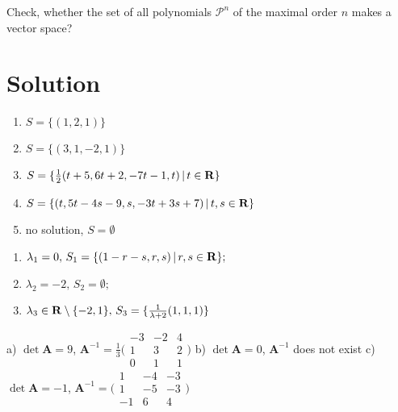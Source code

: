 \documentclass[a4paper,10pt]{book}
\def\Real{{\rm\bf R}}
\def\where{\,|\,}                    %
\begin{document}
\exercise \label{ex:vek8} 
Check, whether the set of all polynomials $\mathcal{P}^{n}$ of the maximal order
$n$ makes a vector space?



\section{Solution}

\begin{enumerate}[leftmargin=.75cm,align=left,label={\alph*)},itemsep=-5pt, topsep=-7pt]
    \item $S=\{(1,2,1)\}$
    \item $S=\{(3,1,-2,1)\}$  
    \item $S=\{\frac{1}{2}(t+5,6t+2,-7t-1,t)\where t\in\Real\}$    
    \item $S=\{(t,5t-4s-9,s,-3t+3s+7)\where t,s\in\Real\}$
    \item no solution, $S=\emptyset$
  \end{enumerate}
  
\begin{enumerate}[leftmargin=.75cm,labelsep=0cm,align=left,label={},itemsep=-5pt, topsep=-7pt]
 \item $\lambda_1=0,\, S_1=\{(1-r-s,r,s)\where r,s\in\Real\};\,$
 \item         $\lambda_2=-2,\, S_2=\emptyset; \,$
 \item    $\lambda_3\in\Real\setminus\{-2,1\},\, S_3=\{\frac{1}{\lambda+2}(1,1,1)\}$
\end{enumerate}

 a) $\det\mathbf{A}=9$, $\mathbf{A}^{-1}=\frac{1}{3}\bigl(\begin{smallmatrix} -3 & -2 & 4\\ 1 & 3 & 2 \\ 0 & 1 & 1 \end{smallmatrix} \bigr)$  
               b) $\det\mathbf{A}=0$, $\mathbf{A}^{-1}$ does not exist
               c) $\det\mathbf{A}=-1$, $\mathbf{A}^{-1}=\bigl(\begin{smallmatrix} 1 & -4 & -3\\ 1 & -5 & -3 \\ -1 & 6 & 4 \end{smallmatrix} \bigr)$  
    
\end{document}
